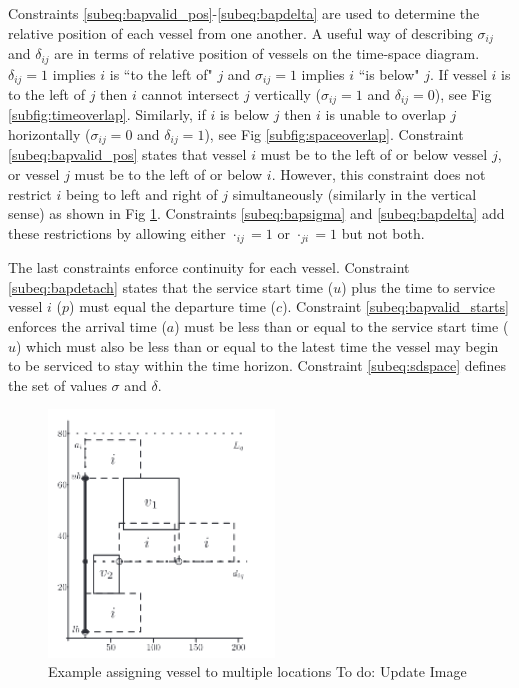 \documentclass[letterpaper, 10pt, conference]{IEEEtran}
\newcommand{\TODO}[1]{{\color{green} To do: #1}} %
\begin{document}
Constraints \ref{subeq:bapvalid_pos}-\ref{subeq:bapdelta} are used to determine the relative position of each vessel from one another. A useful way of describing \(\sigma_{ij}\) and \(\delta_{ij}\) are in terms of relative position of vessels on the time-space diagram. \(\delta_{ij} = 1\) implies \(i\) is ``to the left of" \(j\) and \(\sigma_{ij} = 1\) implies \(i\) ``is below" \(j\). If vessel \(i\) is to the left of \(j\) then \(i\) cannot intersect \(j\) vertically (\(\sigma_{ij} = 1\) and \(\delta_{ij} = 0\)), see Fig \ref{subfig:timeoverlap}. Similarly, if \(i\) is below \(j\) then \(i\) is unable to overlap \(j\) horizontally (\(\sigma_{ij} = 0\) and \(\delta_{ij} = 1\)), see Fig \ref{subfig:spaceoverlap}. Constraint \ref{subeq:bapvalid_pos} states that vessel \(i\) must be to the left of or below vessel \(j\), or vessel \(j\) must be to the left of or below \(i\). However, this constraint does not restrict \(i\) being to left and right of \(j\) simultaneously (similarly in the vertical sense) as shown in Fig \ref{fig:multipleassign}. Constraints \ref{subeq:bapsigma} and \ref{subeq:bapdelta} add these restrictions by allowing either \(\cdot_{ij} = 1\) or \(\cdot_{ji} = 1\) but not both.

The last constraints enforce continuity for each vessel. Constraint \ref{subeq:bapdetach} states that the service start time (\(u\)) plus the time to service vessel \(i\) (\(p\)) must equal the departure time (\(c\)). Constraint \ref{subeq:bapvalid_starts} enforces the arrival time (\(a\)) must be less than or equal to the service start time (\(u\)) which must also be less than or equal to the latest time the vessel may begin to be serviced to stay within the time horizon. Constraint \ref{subeq:sdspace} defines the set of values \(\sigma\) and \(\delta\).

\begin{figure}
	\centerline{\includegraphics[width=6cm]{multipleassign.png}}
	\caption{Example assigning vessel to multiple locations\TODO{Update Image}}
	\label{fig:multipleassign}
\end{figure}
\end{document}
